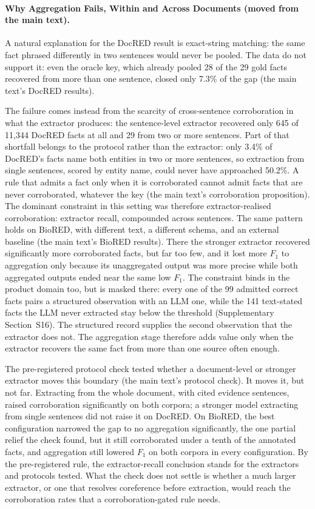 \documentclass[11pt]{article}
\begin{document}
\paragraph{Why Aggregation Fails, Within and Across Documents (moved from the main text).}

A natural explanation for the DocRED result is exact-string matching:
the same fact phrased differently in two sentences would never be
pooled. The data do not support it: even the oracle key, which already pooled 28 of the 29
gold facts recovered from more than one sentence, closed only 7.3\% of
the gap (the main text's DocRED results).

The failure comes instead from the scarcity of cross-sentence
corroboration in what the extractor produces: the sentence-level
extractor recovered only 645 of 11,344 DocRED facts at all and 29 from
two or more sentences. Part of that shortfall belongs to the protocol
rather than the extractor: only 3.4\% of DocRED's facts name both
entities in two or more sentences, so extraction from single sentences,
scored by entity name, could never have approached 50.2\%. A rule that
admits a fact only when it is corroborated cannot admit facts that are
never corroborated, whatever the key
(the main text's corroboration proposition). The dominant constraint in
this setting was therefore extractor-realised corroboration: extractor
recall, compounded across sentences. The same
pattern holds on BioRED, with different text, a different schema, and an
external baseline (the main text's BioRED results). There the stronger
extractor recovered significantly more corroborated facts, but far too
few, and it lost more $F_1$ to aggregation only because its
unaggregated output was more precise while both aggregated outputs ended
near the same low $F_1$. The constraint binds in the product domain
too, but is masked there: every one of the 99 admitted correct facts
pairs a structured observation with an LLM one, while the 141
text-stated facts the LLM never extracted stay below the threshold
(Supplementary Section~S16). The structured record supplies the
second observation that the extractor does not. The aggregation stage
therefore adds value only
when the extractor recovers the same fact from more than one source often
enough.

The pre-registered protocol check tested whether a document-level or
stronger extractor moves this boundary (the main text's protocol check).
It moves it, but not far. Extracting from the whole document, with
cited evidence sentences, raised corroboration significantly on both
corpora; a stronger model extracting from single sentences did not
raise it on DocRED. On BioRED, the best configuration narrowed the gap
to no aggregation significantly, the one partial relief the check
found, but it still corroborated under a tenth of the annotated facts,
and aggregation still lowered $F_1$ on both corpora in every
configuration. By the pre-registered rule, the extractor-recall
conclusion stands for the extractors and protocols tested. What the
check does not settle is whether a much larger extractor, or one that
resolves coreference before extraction, would reach the corroboration
rates that a corroboration-gated rule needs.
\end{document}
